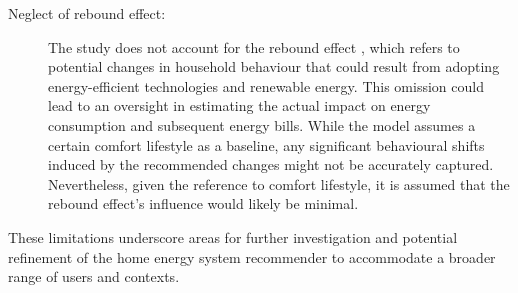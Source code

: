 \begin{description}
    \item[Neglect of rebound effect:] The study does not account for the rebound effect \cite{Herring2007}, which refers to potential changes in household behaviour that could result from adopting energy-efficient technologies and renewable energy. This omission could lead to an oversight in estimating the actual impact on energy consumption and subsequent energy bills. While the model assumes a certain comfort lifestyle as a baseline, any significant behavioural shifts induced by the recommended changes might not be accurately captured. Nevertheless, given the reference to comfort lifestyle, it is assumed that the rebound effect's influence would likely be minimal.
\end{description}
These limitations underscore areas for further investigation and potential refinement of the home energy system recommender to accommodate a broader range of users and contexts.